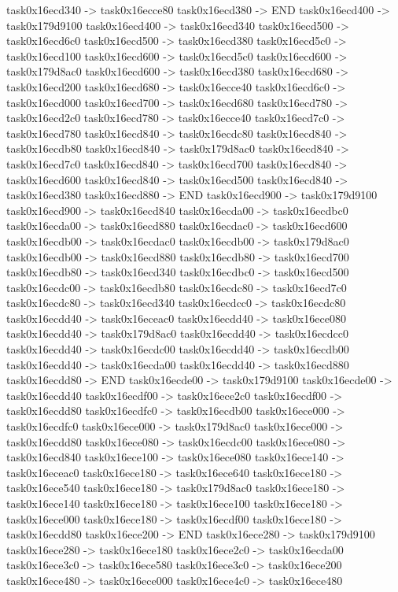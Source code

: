 {	task0x16ecd340 -> task0x16ecce80
	task0x16ecd380 -> END
	task0x16ecd400 -> task0x179d9100
	task0x16ecd400 -> task0x16ecd340
	task0x16ecd500 -> task0x16ecd6c0
	task0x16ecd500 -> task0x16ecd380
	task0x16ecd5c0 -> task0x16ecd100
	task0x16ecd600 -> task0x16ecd5c0
	task0x16ecd600 -> task0x179d8ac0
	task0x16ecd600 -> task0x16ecd380
	task0x16ecd680 -> task0x16ecd200
	task0x16ecd680 -> task0x16ecce40
	task0x16ecd6c0 -> task0x16ecd000
	task0x16ecd700 -> task0x16ecd680
	task0x16ecd780 -> task0x16ecd2c0
	task0x16ecd780 -> task0x16ecce40
	task0x16ecd7c0 -> task0x16ecd780
	task0x16ecd840 -> task0x16ecdc80
	task0x16ecd840 -> task0x16ecdb80
	task0x16ecd840 -> task0x179d8ac0
	task0x16ecd840 -> task0x16ecd7c0
	task0x16ecd840 -> task0x16ecd700
	task0x16ecd840 -> task0x16ecd600
	task0x16ecd840 -> task0x16ecd500
	task0x16ecd840 -> task0x16ecd380
	task0x16ecd880 -> END
	task0x16ecd900 -> task0x179d9100
	task0x16ecd900 -> task0x16ecd840
	task0x16ecda00 -> task0x16ecdbc0
	task0x16ecda00 -> task0x16ecd880
	task0x16ecdac0 -> task0x16ecd600
	task0x16ecdb00 -> task0x16ecdac0
	task0x16ecdb00 -> task0x179d8ac0
	task0x16ecdb00 -> task0x16ecd880
	task0x16ecdb80 -> task0x16ecd700
	task0x16ecdb80 -> task0x16ecd340
	task0x16ecdbc0 -> task0x16ecd500
	task0x16ecdc00 -> task0x16ecdb80
	task0x16ecdc80 -> task0x16ecd7c0
	task0x16ecdc80 -> task0x16ecd340
	task0x16ecdcc0 -> task0x16ecdc80
	task0x16ecdd40 -> task0x16eceac0
	task0x16ecdd40 -> task0x16ece080
	task0x16ecdd40 -> task0x179d8ac0
	task0x16ecdd40 -> task0x16ecdcc0
	task0x16ecdd40 -> task0x16ecdc00
	task0x16ecdd40 -> task0x16ecdb00
	task0x16ecdd40 -> task0x16ecda00
	task0x16ecdd40 -> task0x16ecd880
	task0x16ecdd80 -> END
	task0x16ecde00 -> task0x179d9100
	task0x16ecde00 -> task0x16ecdd40
	task0x16ecdf00 -> task0x16ece2c0
	task0x16ecdf00 -> task0x16ecdd80
	task0x16ecdfc0 -> task0x16ecdb00
	task0x16ece000 -> task0x16ecdfc0
	task0x16ece000 -> task0x179d8ac0
	task0x16ece000 -> task0x16ecdd80
	task0x16ece080 -> task0x16ecdc00
	task0x16ece080 -> task0x16ecd840
	task0x16ece100 -> task0x16ece080
	task0x16ece140 -> task0x16eceac0
	task0x16ece180 -> task0x16ece640
	task0x16ece180 -> task0x16ece540
	task0x16ece180 -> task0x179d8ac0
	task0x16ece180 -> task0x16ece140
	task0x16ece180 -> task0x16ece100
	task0x16ece180 -> task0x16ece000
	task0x16ece180 -> task0x16ecdf00
	task0x16ece180 -> task0x16ecdd80
	task0x16ece200 -> END
	task0x16ece280 -> task0x179d9100
	task0x16ece280 -> task0x16ece180
	task0x16ece2c0 -> task0x16ecda00
	task0x16ece3c0 -> task0x16ece580
	task0x16ece3c0 -> task0x16ece200
	task0x16ece480 -> task0x16ece000
	task0x16ece4c0 -> task0x16ece480
}
